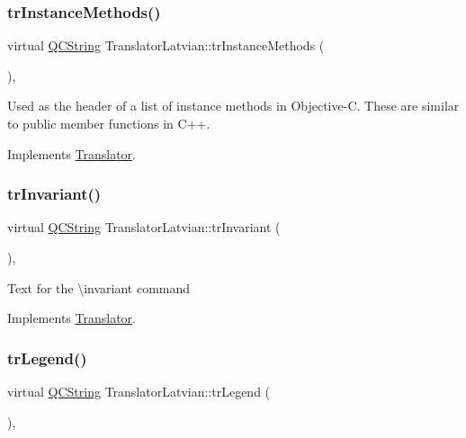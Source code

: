 \subsubsection{\texorpdfstring{trInstanceMethods()}{trInstanceMethods()}}
{\footnotesize\ttfamily virtual \mbox{\hyperlink{class_q_c_string}{Q\+C\+String}} Translator\+Latvian\+::tr\+Instance\+Methods (\begin{DoxyParamCaption}{ }\end{DoxyParamCaption})\hspace{0.3cm}{\ttfamily [inline]}, {\ttfamily [virtual]}}

Used as the header of a list of instance methods in Objective-\/C. These are similar to public member functions in C++. 

Implements \mbox{\hyperlink{class_translator}{Translator}}.

\mbox{\label{class_translator_latvian_aa21a0757219fb5972ce3cd463b55fee1}} 
\subsubsection{\texorpdfstring{trInvariant()}{trInvariant()}}
{\footnotesize\ttfamily virtual \mbox{\hyperlink{class_q_c_string}{Q\+C\+String}} Translator\+Latvian\+::tr\+Invariant (\begin{DoxyParamCaption}{ }\end{DoxyParamCaption})\hspace{0.3cm}{\ttfamily [inline]}, {\ttfamily [virtual]}}

Text for the \textbackslash{}invariant command 

Implements \mbox{\hyperlink{class_translator}{Translator}}.

\mbox{\label{class_translator_latvian_a98d820d53a217539838e457cd1393916}} 
\subsubsection{\texorpdfstring{trLegend()}{trLegend()}}
{\footnotesize\ttfamily virtual \mbox{\hyperlink{class_q_c_string}{Q\+C\+String}} Translator\+Latvian\+::tr\+Legend (\begin{DoxyParamCaption}{ }\end{DoxyParamCaption})\hspace{0.3cm}{\ttfamily [inline]}, {\ttfamily [virtual]}}

